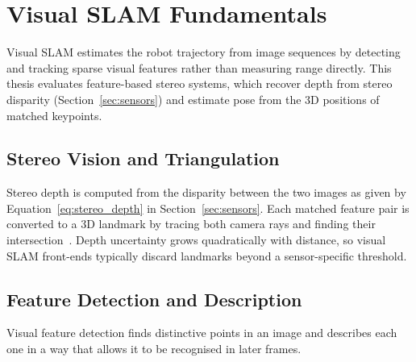 \section{Visual SLAM Fundamentals}

Visual SLAM estimates the robot trajectory from image sequences by detecting
and tracking sparse visual features rather than measuring range directly.
This thesis evaluates feature-based stereo systems, which recover depth from
stereo disparity (Section~\ref{sec:sensors}) and estimate pose from the 3D
positions of matched keypoints.

\subsection{Stereo Vision and Triangulation}

Stereo depth is computed from the disparity between the two images as given
by Equation~\eqref{eq:stereo_depth} in Section~\ref{sec:sensors}.
Each matched feature pair is converted to a 3D landmark by tracing both
camera rays and finding their intersection~\cite[Ch.~11]{hartley2003multiple}.
Depth uncertainty grows quadratically with distance, so visual SLAM
front-ends typically discard landmarks beyond a sensor-specific threshold.

\subsection{Feature Detection and Description}

%
%
Visual feature detection finds distinctive points in an image and describes
each one in a way that allows it to be recognised in later frames.

